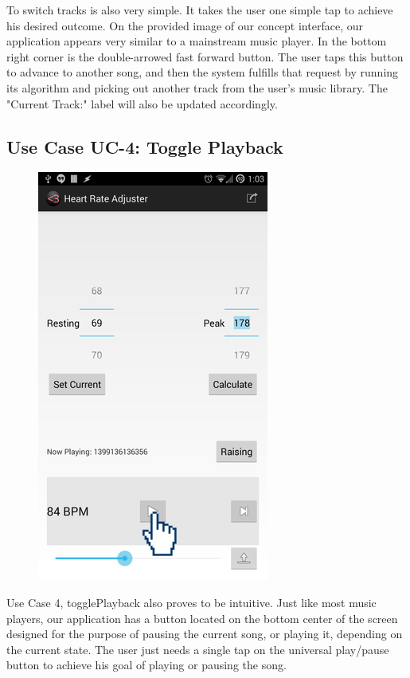 \documentclass[letterpaper,english, 12pt]{scrreprt}
\begin{document}
To switch tracks is also very simple. It takes the user one simple tap to achieve his desired outcome. On the provided image of our concept interface, our application appears very similar to a mainstream music player. In the bottom right corner is the double-arrowed fast forward button. The user taps this button to advance to another song, and then the system fulfills that request by running its algorithm and picking out another track from the user's music library. The "Current Track:" label will also be updated accordingly.

\subsection{Use Case UC-4: Toggle Playback}

\begin{figure}[H]
	\centering
	\includegraphics{img/Prelim_Design/9.png}\\
\end{figure}

Use Case 4, togglePlayback also proves to be intuitive. Just like most music players, our application has a button located on the bottom center of the screen designed for the purpose of pausing the current song, or playing it, depending on the current state. The user just needs a single tap on the universal play/pause button to achieve his goal of playing or pausing the song.\\
\end{document}

